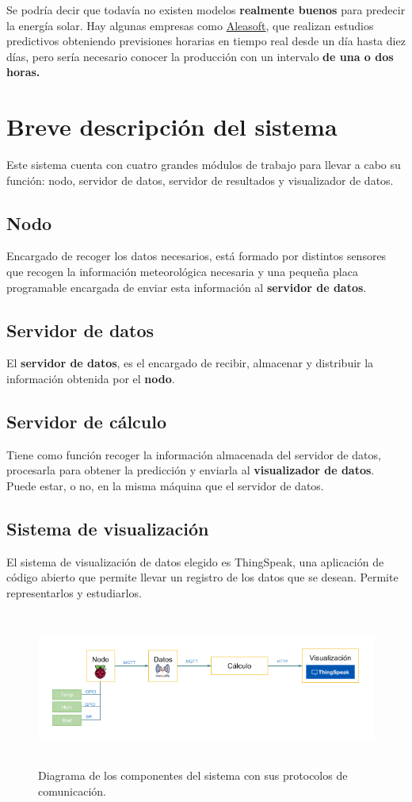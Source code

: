 Se podría decir que todavía no existen modelos \textbf{realmente buenos} para predecir la energía solar. Hay algunas empresas como \href{https://aleasoft.com/es/}{Aleasoft}, que realizan estudios predictivos obteniendo previsiones horarias en tiempo real desde un día hasta diez días, pero sería necesario conocer la producción con un intervalo \textbf{de una o dos horas.}

\section{Breve descripción del sistema}
\label{makereference1.2}

Este sistema cuenta con cuatro grandes módulos de trabajo para llevar a cabo su función: nodo, servidor de datos, servidor de resultados y visualizador de datos.

\subsection{Nodo}
\label{makereference1.2.1}
Encargado de recoger los datos necesarios, está formado por distintos sensores que recogen la información meteorológica necesaria y una pequeña placa programable encargada de enviar esta información al \textbf{servidor de datos}.

\subsection{Servidor de datos}
\label{makereference1.2.2}
El \textbf{servidor de datos}, es el encargado de recibir, almacenar y distribuir la información obtenida por el \textbf{nodo}.

\subsection{Servidor de cálculo}
\label{makereference1.2.3}
Tiene como función recoger la información almacenada del servidor de datos, procesarla para obtener la predicción y enviarla al \textbf{visualizador de datos}. Puede estar, o no, en la misma máquina que el servidor de datos.

\subsection{Sistema de visualización}
\label{makereference1.2.4}
El sistema de visualización de datos elegido es ThingSpeak, una aplicación de código abierto que permite llevar un registro de los datos que se desean. Permite representarlos y estudiarlos.

\begin{figure}[htb]
    \begin{center}
        \includegraphics[height=2in]{figures/diagrama-sistema.png}
        \caption{Diagrama de los componentes del sistema con sus protocolos de comunicación.}
    \end{center}
    \label{diagrama-sistema}
\end{figure}
